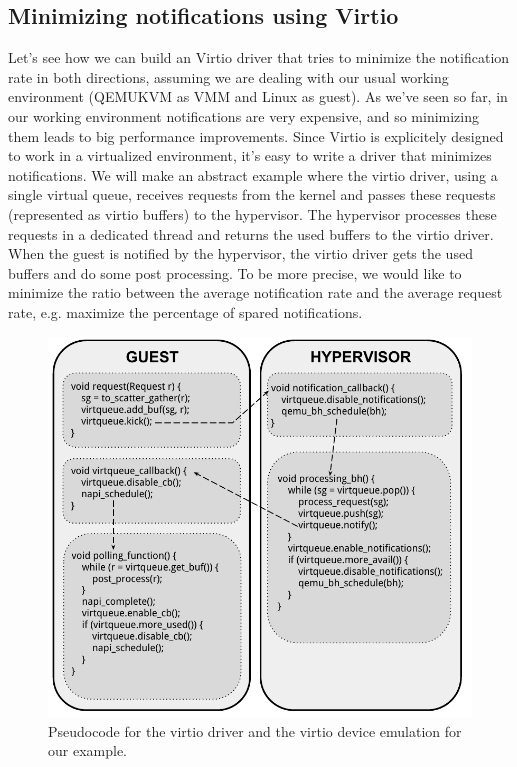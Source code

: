 

\subsection{Minimizing notifications using Virtio}
\label{sec:virtiomin}
Let's see how we can build an Virtio driver that tries to minimize the notification rate in both directions, assuming we are dealing with
our usual working environment (QEMUKVM as VMM and Linux as guest).
As we've seen so far, in our working environment notifications are very expensive, and so minimizing them leads to big performance
improvements. Since Virtio is explicitely designed to work in a virtualized environment, it's easy to write a driver that minimizes
notifications.
We will make an abstract example where the virtio driver, using a single virtual queue, receives requests from the kernel and passes
these requests (represented as virtio buffers) to the hypervisor. The hypervisor processes these requests in a dedicated thread and returns 
the used buffers to the virtio driver. When the guest is notified by the hypervisor, the virtio driver gets the used buffers and do some
post processing. To be more precise, we would like to minimize the ratio between the average notification rate and the average request rate,
e.g. maximize the percentage of spared notifications.

\vspace{0.5cm}

\begin{figure}[bt]
\centering
\includegraphics[scale = 1.0]{virtiocode.pdf}
\caption{Pseudocode for the virtio driver and the virtio device emulation for our example.}
\label{fig:virtiocode}
\end{figure}

